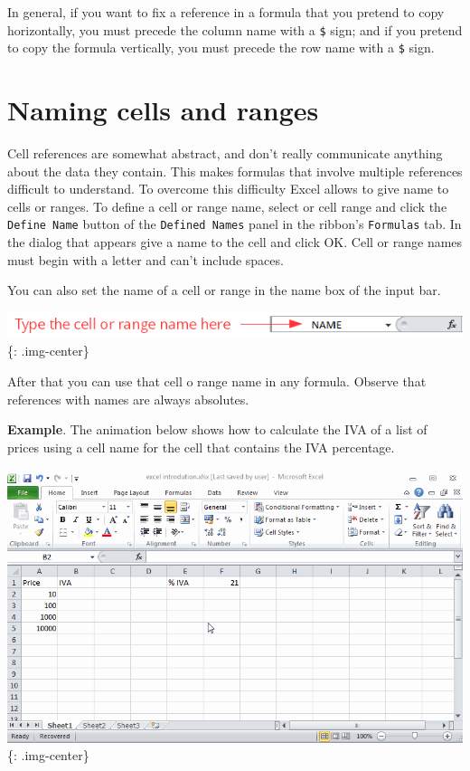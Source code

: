 In general, if you want to fix a reference in a formula that you pretend to copy horizontally, you must precede the
column name with a \texttt{\$} sign; and if you pretend to copy the formula vertically, you must precede the row name with a \texttt{\$}
sign. 

\section{Naming cells and ranges}
\label{namingcellsandranges}

Cell references are somewhat abstract, and don't really communicate anything about the data they contain. This makes formulas that involve multiple references difficult to understand. To overcome this difficulty Excel allows to give name to cells or ranges. To define a cell or range name, select or cell range and click the \texttt{Define Name} button of the \texttt{Defined Names} panel in the ribbon's \texttt{Formulas} tab. In the dialog that appears give a name to the cell and click OK. Cell or range names must begin with a letter and can't include spaces. 

You can also set the name of a cell or range in the name box of the input bar. 

\includegraphics[keepaspectratio,width=\textwidth,height=0.75\textheight]{img/name_box.png}
\{: .img-center\}

After that you can use that cell o range name in any formula. Observe that references with names are always absolutes. 

\textbf{Example}. The animation below shows how to calculate the IVA of a list of prices using a cell name for the cell that contains the IVA percentage. 

\includegraphics[keepaspectratio,width=\textwidth,height=0.75\textheight]{img/example_formulas_with_defined_names.gif}
\{: .img-center\}

